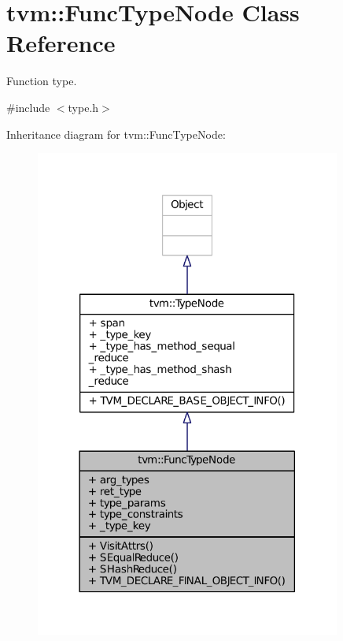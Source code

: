 \hypertarget{classtvm_1_1FuncTypeNode}{}\section{tvm\+:\+:Func\+Type\+Node Class Reference}
\label{classtvm_1_1FuncTypeNode}


Function type.  




{\ttfamily \#include $<$type.\+h$>$}



Inheritance diagram for tvm\+:\+:Func\+Type\+Node\+:
\nopagebreak
\begin{figure}[H]
\begin{center}
\leavevmode
\includegraphics[width=285pt]{classtvm_1_1FuncTypeNode__inherit__graph}
\end{center}
\end{figure}


